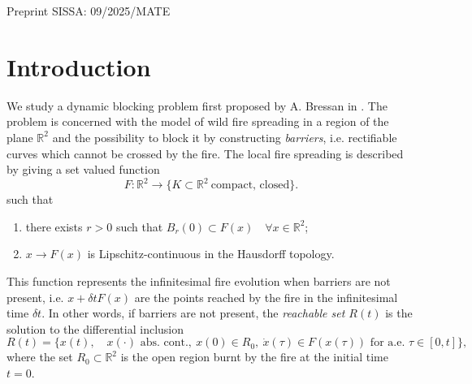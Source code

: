 \documentclass[reqno]{amsart}
\newcounter{assu}
\theoremstyle{definition} \newtheorem{definition}{Definition}[section]
\theoremstyle{definition} \newtheorem{remark}[definition]{Remark}
\theoremstyle{plain} \newtheorem{lemma}[definition]{Lemma}
\theoremstyle{plain} \newtheorem{proposition}[definition]{Proposition}
\theoremstyle{plain} \newtheorem{theorem}[definition]{Theorem}
\theoremstyle{plain} \newtheorem{corollary}[definition]{Corollary}
\theoremstyle{definition} \newtheorem{example}[definition]{Example}
\theoremstyle{plain} \newtheorem{claim}[clai]{Claim}
\theoremstyle{definition} \newtheorem{assumption}[definition]{Assumption}
\theoremstyle{definition} \newtheorem{observation}[definition]{Observation}
\newcommand{\R}{\mathbb{R}}
\newcommand{\1}{\mathbbm 1}
\numberwithin{equation}{section} %
\theoremstyle{plain} \newtheorem*{theorem*}{Theorem}
\theoremstyle{plain} \newtheorem{mthm}[maintheorem]{Main Theorem}
\theoremstyle{plain} \newtheorem*{mthm*}{Main Theorem}
\theoremstyle{plain} \newtheorem*{conjecture*}{Conjecture}
\theoremstyle{plain} \newtheorem{conjecture}[definition]{Conjecture}
\theoremstyle{plain} \newtheorem*{problem*}{Problem}
\begin{document}
\begin{center}
	Preprint SISSA: 09/2025/MATE
\end{center} 


\tableofcontents

\section{Introduction}
\label{S:intro}


We study a dynamic blocking problem first proposed by A. Bressan in \cite{Bressan_2007}. The problem is concerned with the model of wild fire spreading in a region of the plane $\R^2$ and the possibility to block it by constructing \emph{barriers}, i.e. rectifiable curves which cannot be crossed by the fire. The local fire spreading is described by giving a set valued function
$$
F : \R^2 \to \big\{ K \subset \R^2 \ \text{compact, closed} \big\}.
$$
such that
\begin{enumerate}
\item there exists $r>0$ such that $B_r(0)\subset F(x)\quad\forall x\in\R^2$;
\item $x\rightarrow F(x)$ is Lipschitz-continuous in the Hausdorff topology.
\end{enumerate}
This function represents the infinitesimal fire evolution when barriers are not present, i.e. $x + \delta t F(x)$ are the points reached by the fire in the infinitesimal time $\delta t$. In other words, if barriers are not present, the \emph{reachable set $R(t)$} is the solution to the differential inclusion
\begin{equation*}
R(t) = \Big\lbrace x(t), \quad x(\cdot) \text{ abs. cont.},\ x(0) \in R_0,\ \dot x(\tau)\in F(x(\tau))\text{ for a.e. }\tau\in[0,t] \Big\rbrace,
\end{equation*}
where the set $R_0\subset\R^2$ is the open region burnt by the fire at the initial time $t=0$.

%
%
%
\end{document}
